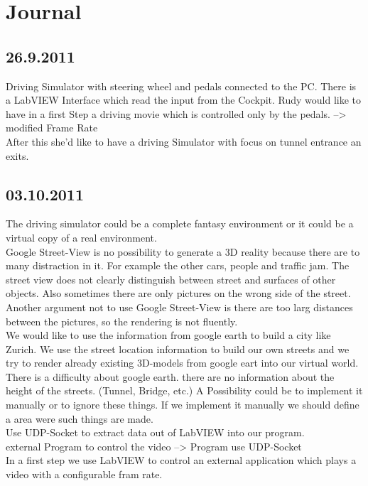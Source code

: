 \section{Journal}
\subsection*{26.9.2011}
Driving Simulator with steering wheel and pedals connected to the PC. There is a LabVIEW Interface which read the input from the Cockpit. Rudy would like to have in a first Step a driving movie which is controlled only by the pedals. --> modified Frame Rate \\
After this she'd like to have a driving Simulator with focus on tunnel entrance an exits.  
\subsection*{03.10.2011}
The driving simulator could be a complete fantasy environment or it could be a virtual copy of a real environment. \\
Google Street-View is no possibility to generate a 3D reality because there are to many distraction in it. For example the other cars, people and traffic jam. The street view does not clearly distinguish between street and surfaces of other objects. Also sometimes there are only pictures on the wrong side of the street.  Another argument not to use Google Street-View is there are too larg distances between the pictures, so the rendering is not fluently.\\
We would like to use the information from google earth to build a city like Zurich. We use the street location information to build our own streets and we try to render already existing 3D-models from google eart into our virtual world. \\
There is a difficulty about google earth. there are no information about the height of the streets. (Tunnel, Bridge, etc.) A Possibility could be to implement it manually or to ignore these things. If we implement it manually we should define a area were such things are made. \\
Use UDP-Socket to extract data out of LabVIEW into our program. \\
external Program to control the video --> Program use UDP-Socket\\
In a first step we use LabVIEW to control an external application which plays a video with a configurable fram rate. 
